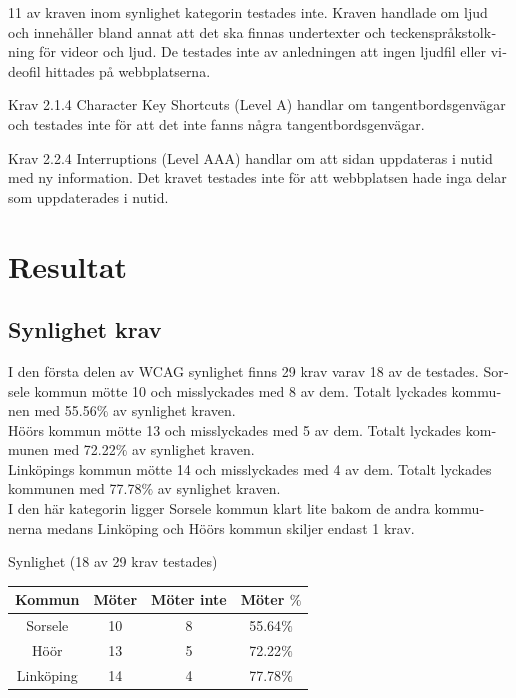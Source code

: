 \documentclass[11p]{article}
\begin{document}
\begin{otherlanguage}{swedish}
    11 av kraven inom synlighet kategorin testades inte.
    Kraven handlade om ljud och innehåller bland annat att det ska finnas undertexter och teckenspråkstolkning för videor och ljud.
    De testades inte av anledningen att ingen ljudfil eller videofil hittades på webbplatserna.

    Krav 2.1.4 Character Key Shortcuts (Level A) handlar om tangentbordsgenvägar och testades inte för att det inte fanns några tangentbordsgenvägar.

    Krav 2.2.4 Interruptions (Level AAA) handlar om att sidan uppdateras i nutid med ny information.
    Det kravet testades inte för att webbplatsen hade inga delar som uppdaterades i nutid.

    \section{Resultat} %



    \subsection{Synlighet krav}
    I den första delen av WCAG synlighet finns 29 krav varav 18 av de testades.
    Sorsele kommun mötte 10 och misslyckades med 8 av dem.
    Totalt lyckades kommunen med 55.56$\%$ av synlighet kraven.
    \\Höörs kommun mötte 13 och misslyckades med 5 av dem.
    Totalt lyckades kommunen med 72.22$\%$ av synlighet kraven.
    \\Linköpings kommun mötte 14 och misslyckades med 4 av dem.
    Totalt lyckades kommunen med 77.78$\%$ av synlighet kraven.
    \\I den här kategorin ligger Sorsele kommun klart lite bakom de andra kommunerna medans Linköping och Höörs kommun skiljer endast 1 krav.

    \newpage
    \begin{center}
    Synlighet (18 av 29 krav testades)

    \begin{tabular}{ |c|c|c|c|}
        \hline
        Kommun & Möter & Möter inte & Möter $\%$ \\  \hline
        Sorsele & 10 & 8 & 55.64$\%$ \\ \hline
        Höör & 13 & 5 & 72.22$\%$ \\ \hline
        Linköping & 14 & 4 & 77.78$\%$ \\ \hline
    \end{tabular}
    \end{center}


\end{otherlanguage}
\end{document}

